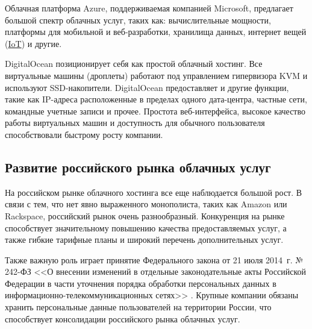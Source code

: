 Облачная платформа Azure, поддерживаемая компанией Microsoft, предлагает большой спектр облачных услуг, таких как: вычислительные мощности, платформы для мобильной и веб-разработки, хранилища данных, интернет вещей (\hyperlink{iot}{IoT}) и другие.

DigitalOcean позиционирует себя как простой облачный хостинг.
Все виртуальные машины (дроплеты) работают под управлением гипервизора KVM и используют SSD-накопители.
DigitalOcean предоставляет и другие функции, такие как IP-адреса расположенные в пределах одного дата-центра, частные сети, командные учетные записи и прочее.
Простота веб-интерфейса, высокое качество работы виртуальных машин и доступность для обычного пользователя способствовали быстрому росту компании.

\subsection{Развитие российского рынка облачных услуг}

На российском рынке облачного хостинга все еще наблюдается большой рост.
В связи с тем, что нет явно выраженного монополиста, таких как Amazon или Rackspace, российский рынок очень разнообразный.
Конкуренция на рынке способствует значительному повышению качества предоставляемых услуг, а также гибкие тарифные планы и широкий перечень дополнительных услуг.

Также важную роль играет принятие Федерального закона от 21 июля 2014~г. № 242-ФЗ <<О внесении изменений в отдельные законодательные акты Российской Федерации в части уточнения порядка обработки персональных данных в информационно-телекоммуникационных сетях>> \cite{minsvyaz}.
Крупные компании обязаны хранить персональные данные пользователей на территории России, что способствует консолидации российского рынка облачных услуг.

